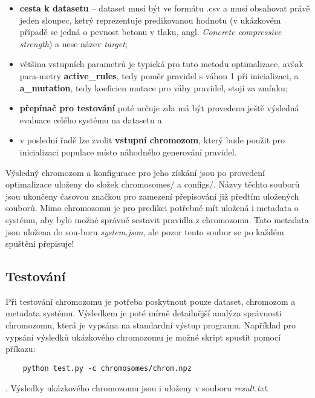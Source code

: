 \documentclass{article}
\begin{document}
\begin{itemize}

    \item \textbf{cesta k datasetu} -- dataset musí být ve formátu .csv a musí obsahovat právě jeden sloupec, ketrý reprezentuje predikovanou hodnotu (v ukázkovém případě se jedná o pevnost betonu v tlaku, angl. \emph{Concrete compressive strength}) a nese název \emph{target};

    \item většina vstupních parametrů je typická pro tuto metodu optimalizace, avšak para-metry \textbf{active\_rules}, tedy poměr pravidel s váhou 1 při inicializaci, a \textbf{a\_mutation}, tedy koeficien mutace pro váhy pravidel, stojí za zmínku;

    \item \textbf{přepínač pro testování} poté určuje zda má být provedena ještě výsledná evaluace celého systému na datasetu a

    \item v poslední řadě lze zvolit \textbf{vstupní chromozom}, který bude použit pro inicializaci populace místo náhodného generování pravidel.
\end{itemize}

Výsledný chromozom a konfigurace pro jeho získání jsou po provedení optimalizace uloženy do složek chromosomes/ a configs/. Názvy těchto souborů jsou ukončeny časovou značkou pro zamezení přepisování již předtím uložených souborů. Mimo chromozomu je pro predikci potřebné mít uložená i metadata o systému, aby bylo možné správně sestavit pravidla z chromozomu. Tato metadata jsou uložena do sou-boru \emph{system.json}, ale pozor tento soubor se po každém spuštění přepisuje!

\subsection{Testování}

Při testování chromozomu je potřeba poskytnout pouze dataset, chromozom a metadata systému. Výsledkem je poté mírně detailnější analýza správnosti chromozomu, která je vypsána na standardní výstup programu. Například pro vypsání výsledků ukázkového chromozomu je možné skript spustit pomocí příkazu:

\begin{verbatim}
    python test.py -c chromosomes/chrom.npz
\end{verbatim}
. Výsledky ukázkového chromozomu jsou i uloženy v souboru \emph{result.txt}.
\end{document}
